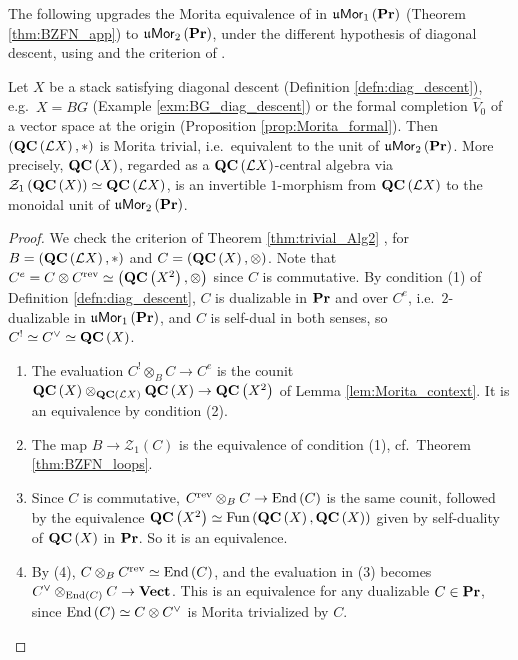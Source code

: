The following upgrades the Morita equivalence of \cite{BZFN:app} in $\mathfrak{u}\mathsf{Mor}_1\left(\mathbf{Pr}\right)$
(Theorem \ref{thm:BZFN_app}) to $\mathfrak{u}\mathsf{Mor}_2\left(\mathbf{Pr}\right)$, under the different hypothesis of diagonal
descent, using \cite{BZFN} and the criterion of \cite[Theorem 2.26]{BJSS}.

\begin{theorem}
\label{thm:trivial_QC}
Let $X$ be a stack satisfying diagonal descent (Definition \ref{defn:diag_descent}), e.g.\
$X = BG$ (Example \ref{exm:BG_diag_descent}) or the formal completion $\widehat V_0$ of a
vector space at the origin (Proposition \ref{prop:Morita_formal}).
Then $\left(\mathbf{QC}\left(\mathcal{L}X\right),*\right)$ is Morita trivial, i.e.\ equivalent to the
unit of $\mathfrak{u}\mathsf{Mor}_2\left(\mathbf{Pr}\right)$.
More precisely, $\mathbf{QC}\left(X\right)$, regarded as a $\mathbf{QC}\left(\mathcal{L} X\right)$-central algebra via
$\mathcal{Z}_1\left(\mathbf{QC}\left(X\right)\right)\simeq\mathbf{QC}\left(\mathcal{L} X\right)$, is an invertible $1$-morphism
from $\mathbf{QC}\left(\mathcal{L}X\right)$ to the monoidal unit of $\mathfrak{u}\mathsf{Mor}_2\left(\mathbf{Pr}\right)$.
\end{theorem}

\begin{proof}
We check the criterion of Theorem \ref{thm:trivial_Alg2} \cite[Theorem 2.26]{BJSS}, for
$B = \left(\mathbf{QC}\left(\mathcal{L} X\right),*\right)$ and $C = \left(\mathbf{QC}\left(X\right),\otimes\right)$. Note
that $C^e = C\otimes C^{\text{rev}}\simeq\left(\mathbf{QC}\left(X^2\right),\otimes\right)$ since $C$ is
commutative.
By condition (1) of Definition \ref{defn:diag_descent}, $C$ is dualizable in $\mathbf{Pr}$ and over
$C^e$, i.e.\ $2$-dualizable in $\mathfrak{u}\mathsf{Mor}_1\left(\mathbf{Pr}\right)$, and $C$ is self-dual in both senses,
so $C^!\simeq C^\vee\simeq\mathbf{QC}\left(X\right)$.
\begin{enumerate}
\item The evaluation $C^!\otimes_B C\to C^e$ is the counit
$\mathbf{QC}\left(X\right)\otimes_{\mathbf{QC}\left(\mathcal{L} X\right)}\mathbf{QC}\left(X\right)\to\mathbf{QC}\left(X^2\right)$ of
Lemma \ref{lem:Morita_context}. It is an equivalence
by condition (2).
\item The map $B\to \mathcal{Z}_1\left(C\right)$ is the equivalence of condition (1), cf.\ Theorem
\ref{thm:BZFN_loops}.
\item[(4)] Since $C$ is commutative, $C^{\text{rev}}\otimes_B C\to\operatorname{End}\left(C\right)$ is the same counit,
followed by the equivalence $\mathbf{QC}\left(X^2\right)\simeq\operatorname{Fun}\left(\mathbf{QC}\left(X\right),\mathbf{QC}\left(X\right)\right)$
given by self-duality of $\mathbf{QC}\left(X\right)$ in $\mathbf{Pr}$. So it is an equivalence.
\item[(3)] By (4), $C\otimes_B C^{\text{rev}}\simeq\operatorname{End}\left(C\right)$, and the evaluation in (3)
becomes $C^\vee\otimes_{\operatorname{End}\left(C\right)}C\to\mathbf{Vect}$. This is an equivalence for any dualizable
$C\in\mathbf{Pr}$, since $\operatorname{End}\left(C\right)\simeq C\otimes C^\vee$ is Morita trivialized by $C$. \qedhere
\end{enumerate}
\end{proof}

